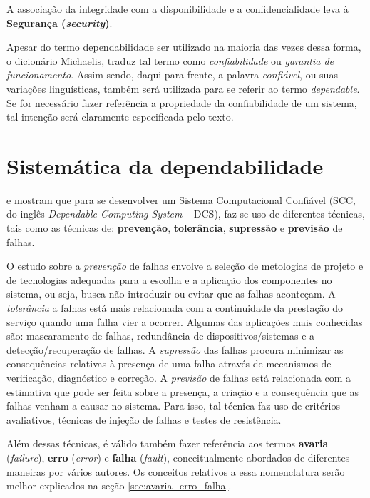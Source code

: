 A associação da integridade com a disponibilidade e a confidencialidade leva à
\textbf{Segurança (\textit{security})}.

Apesar do termo dependabilidade ser utilizado na maioria das vezes dessa forma,
o dicionário Michaelis, traduz tal termo como {\it confiabilidade} ou {\it
garantia de funcionamento}. Assim sendo, daqui para frente, a palavra {\it
confiável}, ou suas variações linguísticas, também será utilizada para se
referir ao termo {\it dependable}. Se for necessário fazer referência a
propriedade da confiabilidade de um sistema, tal intenção será claramente
especificada pelo texto.

\section{Sistemática da dependabilidade}
 e  mostram que para se
desenvolver um Sistema Computacional Confiável (SCC, do inglês {\it Dependable
Computing System} -- DCS), faz-se uso de diferentes técnicas, tais como as
técnicas de: {\bf prevenção}, {\bf tolerância}, {\bf supressão} e {\bf previsão}
de falhas.

O estudo sobre a {\it prevenção} de falhas envolve a seleção de metologias de
projeto e de tecnologias adequadas para a escolha e a aplicação dos componentes
no sistema, ou seja, busca não introduzir ou evitar que as falhas aconteçam. A
{\it tolerância} a falhas está mais relacionada com a continuidade da prestação
do serviço quando uma falha vier a ocorrer. Algumas das aplicações mais
conhecidas são: mascaramento de falhas, redundância de dispositivos/sistemas e a
detecção/recuperação de falhas. A {\it supressão} das falhas procura minimizar
as consequências relativas à presença de uma falha através de mecanismos de
verificação, diagnóstico e correção. A {\it previsão} de falhas está relacionada
com a estimativa que pode ser feita sobre a presença, a criação e a consequência
que as falhas venham a causar no sistema. Para isso, tal técnica faz uso de
critérios avaliativos, técnicas de injeção de falhas e testes de resistência.

Além dessas técnicas, é válido também fazer referência aos termos {\bf avaria}
({\it failure}), {\bf erro} ({\it error}) e {\bf falha} ({\it fault}),
conceitualmente abordados de diferentes maneiras por vários autores. Os
conceitos relativos a essa nomenclatura serão melhor explicados na seção
\ref{sec:avaria_erro_falha}.

